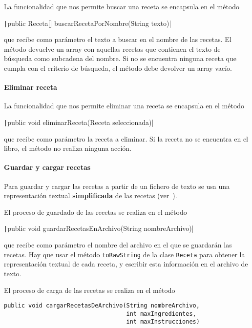 \documentclass[
    a4paper, %
    12pt, %
]{CSSullivanBusinessReport}
\begin{document}
La funcionalidad que nos permite buscar una receta se encapsula en el método

\texttt|public Receta[] buscarRecetaPorNombre(String texto)|

que recibe como parámetro el texto a buscar en el nombre de las recetas. El método devuelve un array con aquellas recetas que contienen el texto de búsqueda como subcadena del nombre. Si no se encuentra ninguna receta que cumpla con el criterio de búsqueda, el método debe devolver un array vacío.

\paragraph{Eliminar receta}

La funcionalidad que nos permite eliminar una receta se encapsula en el método

\texttt|public void eliminarReceta(Receta seleccionada)|

que recibe como parámetro la receta a eliminar. Si la receta no se encuentra en el libro, el método no realiza ninguna acción.

\paragraph{Guardar y cargar recetas}

Para guardar y cargar las recetas a partir de un fichero de texto se usa una representación textual \textbf{simplificada} de las recetas (ver~).

El proceso de guardado de las recetas se realiza en el método

\texttt|public void guardarRecetasEnArchivo(String nombreArchivo)|

que recibe como parámetro el nombre del archivo en el que se guardarán las recetas. Hay que usar el método \texttt{toRawString} de la clase \texttt{Receta} para obtener la representación textual de cada receta, y escribir esta información en el archivo de texto.

El proceso de carga de las recetas se realiza en el método

\begin{verbatim}
public void cargarRecetasDeArchivo(String nombreArchivo, 
                                   int maxIngredientes,
                                   int maxInstrucciones)
\end{verbatim}
\end{document}
